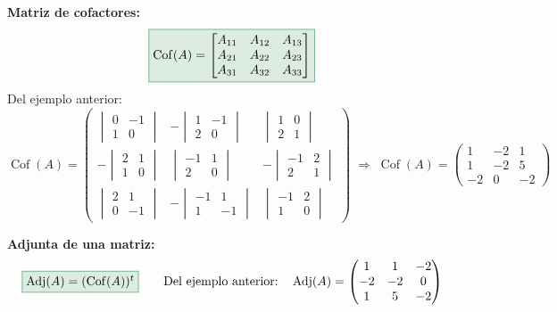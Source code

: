 \documentclass[11pt,a4paper]{article}
\begin{document}
\textbf{Matriz de cofactores:}
\[
\fcolorbox{verde}{verde!15}{$\operatorname{Cof}(A) = \begin{bmatrix}
A_{11} & A_{12} & A_{13}\\
A_{21} & A_{22} & A_{23}\\
A_{31} & A_{32} & A_{33}
\end{bmatrix}$}
\]
Del ejemplo anterior:
\[
\operatorname{Cof}(A) = \begin{pmatrix}
\begin{vmatrix} 0 & -1\\ 1 & 0\end{vmatrix} & -\begin{vmatrix} 1 & -1\\ 2 & 0\end{vmatrix} & \begin{vmatrix} 1 & 0\\ 2 & 1\end{vmatrix}\\[12pt]
-\begin{vmatrix} 2 & 1\\ 1 & 0\end{vmatrix} & \begin{vmatrix} -1 & 1\\ 2 & 0\end{vmatrix} & -\begin{vmatrix} -1 & 2\\ 2 & 1\end{vmatrix}\\[12pt]
\begin{vmatrix} 2 & 1\\ 0 & -1\end{vmatrix} & -\begin{vmatrix} -1 & 1\\ 1 & -1\end{vmatrix} & \begin{vmatrix} -1 & 2\\ 1 & 0\end{vmatrix}
\end{pmatrix}
\;\Rightarrow\;
\operatorname{Cof}(A) = \begin{pmatrix} 1 & -2 & 1\\ 1 & -2 & 5\\ -2 & 0 & -2\end{pmatrix}
\]

\textbf{Adjunta de una matriz:}
\[
\fcolorbox{verde}{verde!15}{$\operatorname{Adj}(A) = (\operatorname{Cof}(A))^t$}
\qquad \text{Del ejemplo anterior:}\quad
\operatorname{Adj}(A) = \begin{pmatrix} 1 & 1 & -2\\ -2 & -2 & 0\\ 1 & 5 & -2\end{pmatrix}
\]
\end{document}
